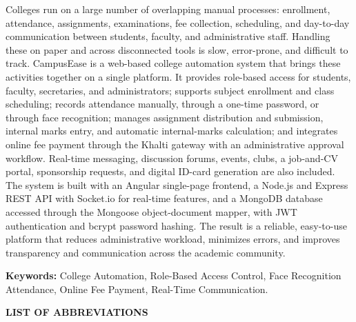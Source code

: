 \documentclass[12pt,a4paper]{report}
\begin{document}
Colleges run on a large number of overlapping manual processes: enrollment, attendance, assignments, examinations, fee collection, scheduling, and day-to-day communication between students, faculty, and administrative staff. Handling these on paper and across disconnected tools is slow, error-prone, and difficult to track. CampusEase is a web-based college automation system that brings these activities together on a single platform. It provides role-based access for students, faculty, secretaries, and administrators; supports subject enrollment and class scheduling; records attendance manually, through a one-time password, or through face recognition; manages assignment distribution and submission, internal marks entry, and automatic internal-marks calculation; and integrates online fee payment through the Khalti gateway with an administrative approval workflow. Real-time messaging, discussion forums, events, clubs, a job-and-CV portal, sponsorship requests, and digital ID-card generation are also included. The system is built with an Angular single-page frontend, a Node.js and Express REST API with Socket.io for real-time features, and a MongoDB database accessed through the Mongoose object-document mapper, with JWT authentication and bcrypt password hashing. The result is a reliable, easy-to-use platform that reduces administrative workload, minimizes errors, and improves transparency and communication across the academic community.

\vspace{0.6cm}
\noindent\textbf{Keywords:} College Automation, Role-Based Access Control, Face Recognition Attendance, Online Fee Payment, Real-Time Communication.

\clearpage

\tableofcontents
\clearpage
{}
\listoffigures
\clearpage
{}
\listoftables
\clearpage

\begin{center}\textbf{\fontsize{16}{19}\selectfont LIST OF ABBREVIATIONS}\end{center}
\vspace{0.6cm}
\end{document}
